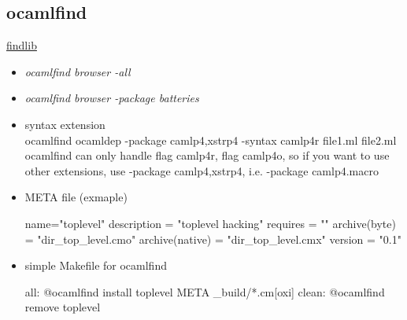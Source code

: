 \subsection{ocamlfind}

\href{http://projects.camlcity.org/projects/dl/findlib-1.2.3/doc/ref-html/r17.html}{findlib}


\begin{itemize}
\item \emph{ocamlfind browser -all }

\item \emph{ocamlfind browser -package batteries}

\item syntax extension \\
ocamlfind ocamldep -package camlp4,xstrp4 -syntax camlp4r file1.ml file2.ml \\
ocamlfind can only handle flag camlp4r, flag camlp4o, so if you want to
use other extensions,  use -package camlp4,xstrp4, i.e. -package camlp4.macro
  
\item META file (exmaple)


\begin{bluetext}
name="toplevel"
description = "toplevel hacking"
requires = ""
archive(byte) = "dir_top_level.cmo"
archive(native) = "dir_top_level.cmx"
version = "0.1"
\end{bluetext}


\item simple Makefile for ocamlfind 


\begin{bluetext}
all:
	   @ocamlfind install toplevel META _build/*.cm[oxi]
clean: 
	   @ocamlfind remove toplevel 
\end{bluetext}


         
\end{itemize}

  

